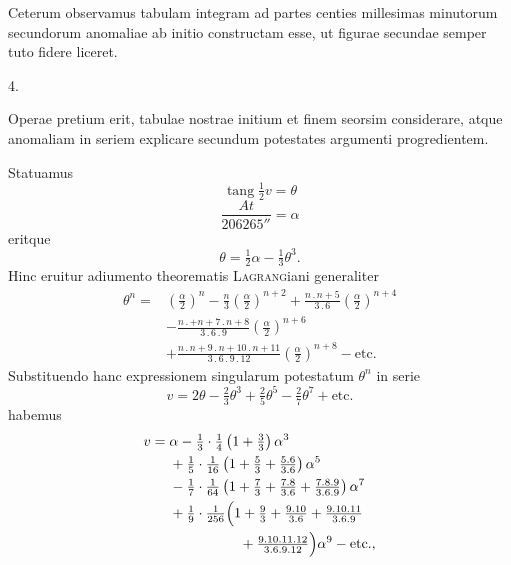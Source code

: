 \par
Ceterum observamus tabulam integram ad partes centies millesimas minutorum secundorum anomaliae ab initio constructam esse, ut figurae secundae semper tuto fidere liceret.
\par\medskip
{}
\begin{center}4.\end{center}
\noindent\hspace*{\parindent}Operae pretium erit, tabulae nostrae initium et finem seorsim considerare, atque anomaliam in seriem explicare secundum potestates argumenti progredientem.
\par
Statuamus
\[
\operatorname{tang}\tfrac12v=\theta
\]
\[
\frac{At}{206265''}=\alpha
\]
eritque
\[
\theta=\tfrac12\alpha-\tfrac13\theta^3.
\]
Hinc eruitur adiumento theorematis \textsc{Lagrang}iani generaliter
\[
\begin{aligned}
\theta^n={}&\left(\frac{\alpha}{2}\right)^n-\frac{n}{3}\left(\frac{\alpha}{2}\right)^{n+2}
+\frac{n\mathpunct{.}n+5}{3\mathpunct{.}6}\left(\frac{\alpha}{2}\right)^{n+4}\\
&-\frac{n\mathpunct{.}+n+7\mathpunct{.}n+8}{3\mathpunct{.}6\mathpunct{.}9}\left(\frac{\alpha}{2}\right)^{n+6}\\
&+\frac{n\mathpunct{.}n+9\mathpunct{.}n+10\mathpunct{.}n+11}{3\mathpunct{.}6\mathpunct{.}9\mathpunct{.}12}\left(\frac{\alpha}{2}\right)^{n+8}-\text{etc.}
\end{aligned}
\]
Substituendo hanc expressionem singularum potestatum \(\theta^n\) in serie
\[
v=2\theta-\tfrac23\theta^3+\tfrac25\theta^5-\tfrac27\theta^7+\text{etc.}
\]
habemus
\[
\begin{aligned}
v={}&\alpha-\tfrac13\cdot\tfrac14\left(1+\tfrac33\right)\alpha^3\\
&+\tfrac15\cdot\tfrac1{16}\left(1+\tfrac53+\tfrac{5\mathpunct{.}6}{3\mathpunct{.}6}\right)\alpha^5\\
&-\tfrac17\cdot\tfrac1{64}\left(1+\tfrac73+\tfrac{7\mathpunct{.}8}{3\mathpunct{.}6}+\tfrac{7\mathpunct{.}8\mathpunct{.}9}{3\mathpunct{.}6\mathpunct{.}9}\right)\alpha^7\\
&+\tfrac19\cdot\tfrac1{256}\Bigl(1+\tfrac93+\tfrac{9\mathpunct{.}10}{3\mathpunct{.}6}+\tfrac{9\mathpunct{.}10\mathpunct{.}11}{3\mathpunct{.}6\mathpunct{.}9}\\
&\hspace{5em}+\tfrac{9\mathpunct{.}10\mathpunct{.}11\mathpunct{.}12}{3\mathpunct{.}6\mathpunct{.}9\mathpunct{.}12}\Bigr)\alpha^9-\text{etc.,}
\end{aligned}
\]
